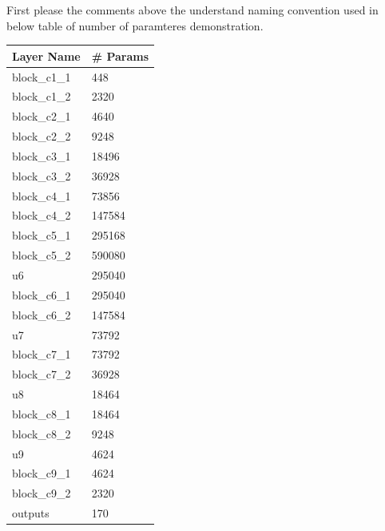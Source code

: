 \documentclass[11pt]{article}
\begin{document}
    First please the comments above the understand naming convention used in
below table of number of paramteres demonstration.

\begin{longtable}[]{@{}ll@{}}
\toprule
Layer Name & \# Params\tabularnewline
\midrule
\endhead
block\_c1\_1 & 448\tabularnewline
block\_c1\_2 & 2320\tabularnewline
block\_c2\_1 & 4640\tabularnewline
block\_c2\_2 & 9248\tabularnewline
block\_c3\_1 & 18496\tabularnewline
block\_c3\_2 & 36928\tabularnewline
block\_c4\_1 & 73856\tabularnewline
block\_c4\_2 & 147584\tabularnewline
block\_c5\_1 & 295168\tabularnewline
block\_c5\_2 & 590080\tabularnewline
u6 & 295040\tabularnewline
block\_c6\_1 & 295040\tabularnewline
block\_c6\_2 & 147584\tabularnewline
u7 & 73792\tabularnewline
block\_c7\_1 & 73792\tabularnewline
block\_c7\_2 & 36928\tabularnewline
u8 & 18464\tabularnewline
block\_c8\_1 & 18464\tabularnewline
block\_c8\_2 & 9248\tabularnewline
u9 & 4624\tabularnewline
block\_c9\_1 & 4624\tabularnewline
block\_c9\_2 & 2320\tabularnewline
outputs & 170\tabularnewline
\bottomrule
\end{longtable}


    
    
    
    
\end{document}
